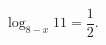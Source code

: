 \begin{ex}[type=equation]
	\begin{condition}
		$\log_{8 - x} 11 = \dfrac{1}{2}.$
	\end{condition}
\end{ex}